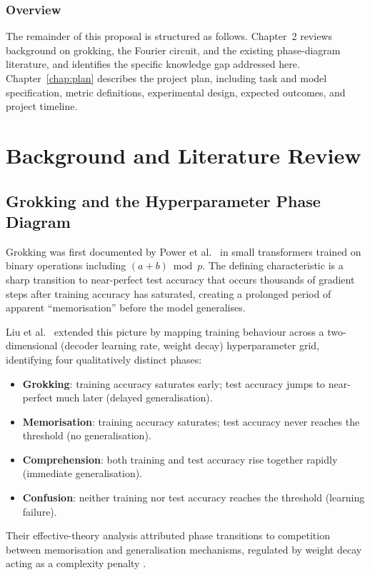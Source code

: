 \documentclass[12pt,openany,a4paper]{book}
\begin{document}
\subsection{Overview}

The remainder of this proposal is structured as follows.
Chapter~2 reviews background on grokking, the Fourier circuit, and
the existing phase-diagram literature, and identifies the specific
knowledge gap addressed here.
Chapter~\ref{chap:plan} describes the project plan, including task and model
specification, metric definitions, experimental design, expected
outcomes, and project timeline.

\chapter{Background and Literature Review}

\section{Grokking and the Hyperparameter Phase Diagram}

Grokking was first documented by Power et al.\ \cite{power2022grokking}
in small transformers trained on binary operations including
$(a+b)\bmod p$.
The defining characteristic is a sharp transition to near-perfect test
accuracy that occurs thousands of gradient steps after training
accuracy has saturated, creating a prolonged period of apparent
``memorisation'' before the model generalises.

Liu et al.\ \cite{liu2022towards} extended this picture by mapping
training behaviour across a two-dimensional (decoder learning rate,
weight decay) hyperparameter grid, identifying four qualitatively
distinct phases:
\begin{itemize}
  \item \textbf{Grokking}: training accuracy saturates early; test
    accuracy jumps to near-perfect much later (delayed generalisation).
  \item \textbf{Memorisation}: training accuracy saturates; test
    accuracy never reaches the threshold (no generalisation).
  \item \textbf{Comprehension}: both training and test accuracy rise
    together rapidly (immediate generalisation).
  \item \textbf{Confusion}: neither training nor test accuracy reaches
    the threshold (learning failure).
\end{itemize}
Their effective-theory analysis attributed phase transitions to
competition between memorisation and generalisation mechanisms,
regulated by weight decay acting as a complexity penalty
\cite{krogh1991weightdecay}.
\end{document}
